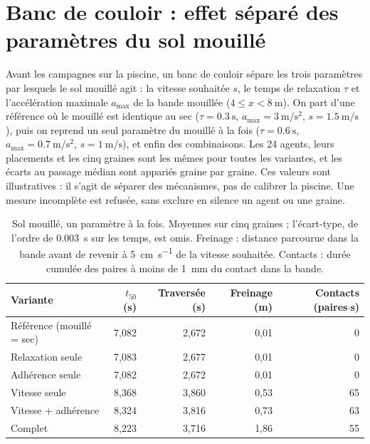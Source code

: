 \section{Banc de couloir : effet séparé des paramètres du sol mouillé}
\label{sec:annexe-couloir}

Avant les campagnes sur la piscine, un banc de couloir sépare les trois paramètres par
lesquels le sol mouillé agit : la vitesse souhaitée $s$, le temps de relaxation $\tau$ et
l'accélération maximale $a_{\max}$ de la bande mouillée ($4\leq x<\SI{8}{\metre}$). On part
d'une référence où le mouillé est identique au sec ($\tau=\SI{0.3}{\second}$,
$a_{\max}=\SI{3}{\metre\per\second\squared}$, $s=\SI{1.5}{\metre\per\second}$), puis on
reprend un seul paramètre du mouillé à la fois ($\tau=\SI{0.6}{\second}$,
$a_{\max}=\SI{0.7}{\metre\per\second\squared}$, $s=\SI{1}{\metre\per\second}$), et enfin des
combinaisons. Les 24 agents, leurs placements et les cinq graines sont les mêmes pour toutes
les variantes, et les écarts au passage médian sont appariés graine par graine. Ces valeurs
sont illustratives : il s'agit de séparer des mécanismes, pas de calibrer la piscine. Une
mesure incomplète est refusée, sans exclure en silence un agent ou une graine.

\begin{table}[ht]
\centering
\caption{Sol mouillé, un paramètre à la fois. Moyennes sur cinq graines ; l'écart-type, de
l'ordre de \SI{0.003}{\second} sur les temps, est omis. Freinage : distance parcourue dans la
bande avant de revenir à \SI{5}{\centi\metre\per\second} de la vitesse souhaitée. Contacts :
durée cumulée des paires à moins de \SI{1}{\milli\metre} du contact dans la bande.}
\label{tab:mouille}
\begin{tabular}{lrrrr}
\toprule
Variante & $t_{50}$ (s) & Traversée (s) & Freinage (m) & Contacts (paires$\cdot$s) \\
\midrule
Référence (mouillé = sec) & 7,082 & 2,672 & 0,01 & 0 \\
Relaxation seule & 7,083 & 2,677 & 0,01 & 0 \\
Adhérence seule & 7,082 & 2,672 & 0,01 & 0 \\
Vitesse seule & 8,368 & 3,860 & 0,53 & 65 \\
Vitesse + adhérence & 8,324 & 3,816 & 0,73 & 63 \\
Complet & 8,223 & 3,716 & 1,86 & 55 \\
\bottomrule
\end{tabular}
\end{table}

